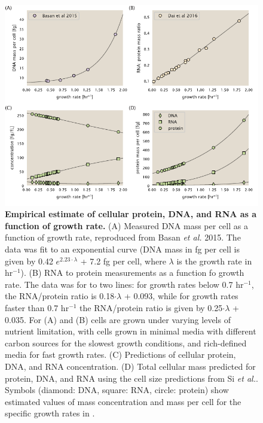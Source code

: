 \begin{figure}
		\centering
    \includegraphics[width=1\textwidth]{SI_figs/schmidt_estimate_protein_RNA_DNA_corrections.pdf}
  \caption{{\bf Empirical estimate of cellular protein, DNA, and RNA as a
  function of growth rate.} (A) Measured DNA mass per cell as a function of
  growth rate, reproduced from Basan \textit{et al.} 2015. The data was fit to
  an exponential curve (DNA mass in fg per cell is given by 0.42 $e^{2.23 \cdot
  \lambda}$ + 7.2 fg per cell, where $\lambda$ is the growth rate in hr$^{-1}$).
  (B) RNA to protein measurements as a function fo growth rate. The data was for
  to two lines: for growth rates below 0.7 hr$^{-1}$, the RNA/protein ratio is
  0.18$\cdot \lambda$ + 0.093, while for growth rates faster than 0.7 hr$^{-1}$
  the RNA/protein ratio is given by 0.25$\cdot \lambda$ + 0.035. For (A) and (B)
  cells are grown under varying levels of nutrient limitation, with cells grown
  in minimal media with different carbon sources for the slowest growth
  conditions, and rich-defined media for fast growth rates. (C) Predictions of
  cellular protein, DNA, and RNA concentration.  (D) Total cellular mass
  predicted for protein, DNA, and RNA using the cell size predictions from Si
  \textit{et al.}. Symbols (diamond: DNA, square: RNA, circle: protein)
	show estimated values of mass concentration and mass per cell for the specific
	growth rates in \cite{schmidt2016}.
	 	}
  \label{fig:schmidt_adjustment_varying_conc}
\end{figure}

